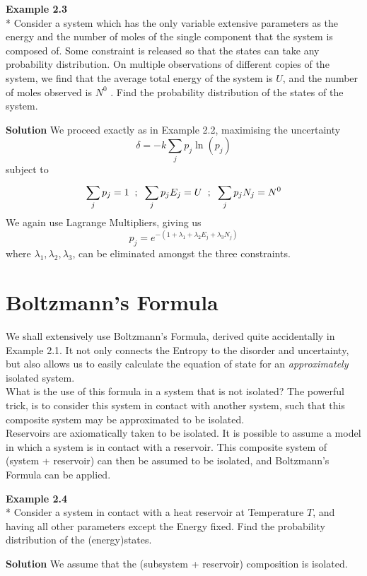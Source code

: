 \documentclass[oneside]{book}
\begin{document}
 \begin{mdframed}[style=exercise]
\textbf{Example 2.3}
 \\* Consider a system which has the only variable extensive parameters as the energy and the number of moles of the single component that the system is composed of. Some constraint is released so that the states can take any probability distribution. On multiple observations of different copies of the system, we find that the average total energy of the system is $U$, and the number of moles observed is $N^0$ . Find the probability distribution of the states of the system.
 \end{mdframed}
 \textbf{Solution} We proceed exactly as in Example 2.2, maximising the uncertainty 
 \[ \delta = -k\sum_{j}^{}p_j\ln(p_j)\]
 subject to 
  \[\sum_{j}^{}p_j = 1\hspace{0.2cm};\hspace{0.2cm} \sum_{j}^{}p_jE_j = U\hspace{0.2cm}; \hspace{0.2cm} \sum_{j}^{}p_jN_j = N^0\]
  We again use Lagrange Multipliers, giving us
   \[ p_j = e^{-(1 + \lambda_1 + \lambda_2E_j + \lambda_3N_j)}\]
where $\lambda_1,\lambda_2,\lambda_3$, can be eliminated amongst the three constraints.


\section{Boltzmann's Formula}
We shall extensively use Boltzmann's Formula, derived quite accidentally in Example 2.1. It not only connects the Entropy to the disorder and uncertainty, but also allows us to easily calculate the equation of state for an \emph{approximately} isolated system.\\

What is the use of this formula in a system that is not isolated? The powerful trick, is to consider this system in contact with another system, such that this composite system may be approximated to be isolated.\\

Reservoirs are axiomatically taken to be isolated. It is possible to assume a model in which a system is in contact with a reservoir. This composite system of (system + reservoir) can then be assumed to be isolated, and Boltzmann's Formula can be applied.

 \begin{mdframed}[style=exercise]
\textbf{Example 2.4}
 \\* Consider a system in contact with a heat reservoir at Temperature $T$, and having all other parameters except the Energy fixed. Find the probability distribution of the (energy)states.
 \end{mdframed}
\textbf{Solution} 
We assume that the (subsystem + reservoir) composition is isolated.\\
\end{document}
